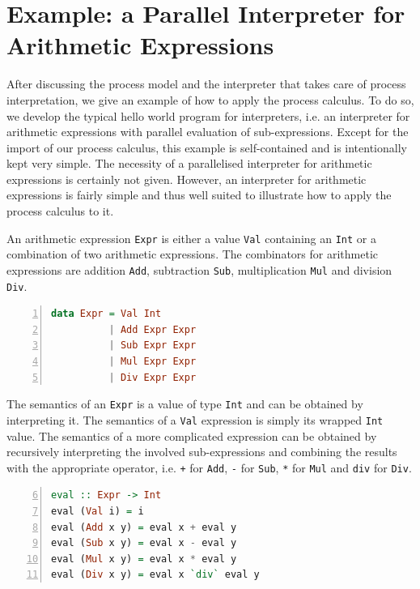 \clearpage
\section{Example: a Parallel Interpreter for Arithmetic Expressions}
\label{chp:example}
After discussing the process model and the interpreter that takes care of process interpretation, we give an example of how to apply the process calculus. To do so, we develop the typical hello world program for interpreters, i.e. an interpreter for arithmetic expressions with parallel evaluation of sub-expressions. Except for the import of our process calculus, this example is self-contained and is intentionally kept very simple. The necessity of a parallelised interpreter for arithmetic expressions is certainly not given. However, an interpreter for arithmetic expressions is fairly simple and thus well suited to illustrate how to apply the process calculus to it.

An arithmetic expression \texttt{Expr} is either a value \texttt{Val} containing an \texttt{Int} or a combination of two arithmetic expressions. The combinators for arithmetic expressions are addition \texttt{Add}, subtraction \texttt{Sub}, multiplication \texttt{Mul} and division \texttt{Div}.
\begin{lstlisting}[language=Haskell, caption=Data model for the representation of arithmetic expressions., label=lst:arith_model, numbers=left, frame=bt]
data Expr = Val Int
          | Add Expr Expr
          | Sub Expr Expr
          | Mul Expr Expr
          | Div Expr Expr
\end{lstlisting}

The semantics of an \texttt{Expr} is a value of type \texttt{Int} and can be obtained by interpreting it. The semantics of a \texttt{Val} expression is simply its wrapped \texttt{Int} value. The semantics of a more complicated expression can be obtained by recursively interpreting the involved sub-expressions and combining the results with the appropriate operator, i.e. \texttt{+} for \texttt{Add}, \texttt{-} \nolinebreak for \texttt{Sub}, \texttt{*} for \texttt{Mul} and \texttt{div} for \texttt{Div}.
\begin{lstlisting}[language=Haskell, caption=Implementation of an interpreter for arithmetic expressions., label=lst:arith_eval, numbers=left, frame=bt, firstnumber=6]
eval :: Expr -> Int
eval (Val i) = i
eval (Add x y) = eval x + eval y
eval (Sub x y) = eval x - eval y
eval (Mul x y) = eval x * eval y
eval (Div x y) = eval x `div` eval y
\end{lstlisting}

